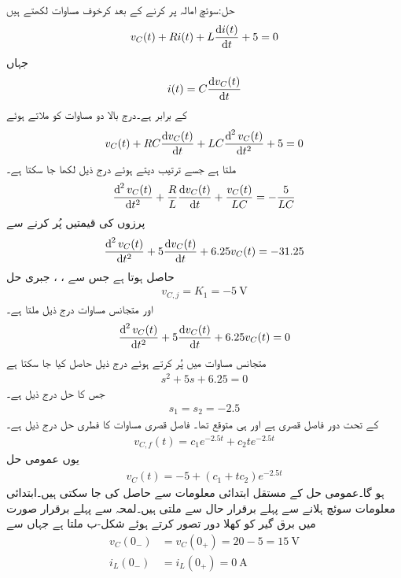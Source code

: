 حل:سوئچ امالہ پر کرنے کے بعد کرخوف مساوات لکھتے ہیں
\begin{align*}
v_C(t)+R i(t)+L\frac{\dif i(t)}{\dif t}+5=0
\end{align*}
جہاں
\begin{align*}
i(t)=C\frac{\dif v_C(t)}{\dif t}
\end{align*}
کے برابر ہے۔درج بالا دو مساوات کو ملاتے ہوئے
\begin{align*}
v_C(t)+RC\frac{\dif v_C(t)}{\dif t}+LC\frac{\dif ^{\, 2}v_C(t)}{\dif t^2}+5=0
\end{align*}
ملتا ہے  جسے ترتیب دیتے ہوئے درج ذیل لکھا جا سکتا ہے۔
\begin{align*}
\frac{\dif ^{\, 2}v_C(t)}{\dif t^2}+\frac{R}{L}\frac{\dif v_C(t)}{\dif t}+\frac{v_C(t)}{LC}=-\frac{5}{LC}
\end{align*}
پرزوں کی قیمتیں پُر کرنے سے
\begin{align*}
\frac{\dif ^{\, 2}v_C(t)}{\dif t^2}+5\frac{\dif v_C(t)}{\dif t}+6.25 v_C(t)=-31.25
\end{align*}
حاصل ہوتا ہے جس سے ، ، جبری حل 
\begin{align*}
v_{C,j}=K_1=\SI{-5}{\volt}
\end{align*}
 اور متجانس مساوات درج ذیل ملتا ہے۔
\begin{align*}
\frac{\dif ^{\, 2}v_C(t)}{\dif t^2}+5\frac{\dif v_C(t)}{\dif t}+6.25 v_C(t)=0
\end{align*}
متجانس مساوات میں  پُر کرتے ہوئے درج ذیل حاصل کیا جا سکتا ہے
\begin{align}
s^2+5s+6.25=0
\end{align}
جس کا حل درج ذیل ہے۔
\begin{align*}
s_1=s_2=-2.5
\end{align*}
 کے تحت  دور فاصل قصری ہے اور  ہی متوقع تھا۔ فاصل قصری مساوات کا فطری حل درج ذیل ہے۔
\begin{align*}
v_{C,f}(t)=c_1e^{-2.5t}+c_2 t e^{-2.5t}
\end{align*}
یوں عمومی حل
\begin{align}\label{مساوات_عارضی_مکمل_حل_مثال_دو_درجی_ب}
v_C(t)=-5+(c_1+tc_2)e^{-2.5t}
\end{align}
ہو گا۔عمومی حل کے مستقل ابتدائی معلومات سے حاصل کی جا سکتی ہیں۔ابتدائی معلومات سوئچ ہلانے سے پہلے برقرار حال سے ملتی ہیں۔لمحہ  سے پہلے برقرار صورت میں برق گیر کو کھلا دور تصور کرتے ہوئے شکل-ب ملتا ہے جہاں سے
\begin{align*}
v_C(0_-)&=v_C(0_+)=20-5=\SI{15}{\volt}\\
i_L(0_-)&=i_L(0_+)=\SI{0}{\ampere}
\end{align*}
